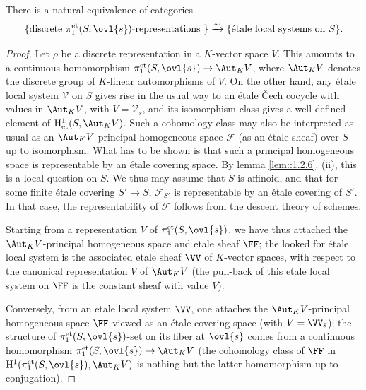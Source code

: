 \begin{pro}\label{pro::3.4.4} There is a natural equivalence of categories   
\begin{equation*}
\{\text{discrete }\pi_1^{\mathrm{et}}(S,\ovl{s})\text{-representations }\}
 \xrightarrow{\sim}
 \{\text{\'etale local systems on $S$}\}.
\end{equation*}
\end{pro}

\begin{proof}
 Let $\rho $ be a discrete representation in a $K$-vector space
 $V$. This amounts to a continuous homomorphism $\pi_1^{\mathrm{et}}(S,
 \ovl{s}) \to \Aut_K V$, where $\Aut_K V$ denotes the discrete group of
 $K$-linear automorphisms of $V$.  On the other hand, any \'etale local
 system $\mathcal{V}$ on $S$ gives rise in the usual way to an \'etale 
 \v{C}ech cocycle with values in $\Aut_K V$, with $V=\mathcal{V}_s$, and
 its isomorphism class gives a well-defined element of 
 $\mathrm{H}^1_{\mathrm{et}}(S, \Aut_K V)$. Such a cohomology class may also be
 interpreted as usual as an $\Aut_K V$-principal homogeneous space
 $\mathcal{F}$ (as an \'etale sheaf) over $S$ up to isomorphism. What has
 to be shown is that such a principal homogeneous space is representable
 by an \'etale covering space. By lemma \ref{lem::1.2.6}. (ii), this is a local
 question on $S$. We thus may assume that $S$ is affinoid, and that for
 some finite \'etale covering $S'\to S$, $\mathcal{F}_{S'}$ is
 representable by an \'etale covering of $S'$. In that case, the
 representability of $\mathcal{F}$ follows from the descent theory of
 schemes.

 Starting from a representation $V$ of $\pi_1^{\mathrm{et}}(S,\ovl{s})$, we 
 have thus attached the $\Aut_K V$-principal homogeneous space and 
 etale sheaf $\FF$; the looked for \'etale local system is the 
 associated etale sheaf $\VV$ of $K$-vector spaces, with respect to 
 the canonical representation $V$ of $\Aut_K V$ (the pull-back of this 
 etale local system on $\FF$ is the constant sheaf with value $V$).
 
 Conversely, from an etale local system $\VV$, one attaches the $\Aut_K 
 V$-principal homogeneous space $\FF$ viewed as an \'etale covering 
 space (with $V=\VV_{\bar s}$); the structure of
 $\pi_1^{\mathrm{et}}(S,\ovl{s})$-set on its fiber at $\ovl{s}$ comes from
 a continuous homomorphism 
 $\pi_1^{\mathrm{et}}(S,\ovl{s})\to \Aut_K V$ (the cohomology class of
 $\FF$ in $\mathrm{H}^1(\pi_1^{\mathrm{et}}(S,\ovl{s}), \Aut_K V)$ is
 nothing but the latter homomorphism up to conjugation).
\end{proof}

